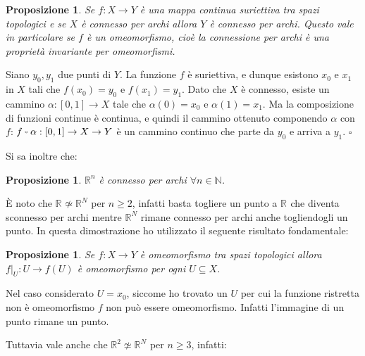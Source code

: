 \documentclass[10pt, twoside=false, x11names]{scrbook}
\newtheorem{proposition}[theorem]{Proposizione}
\newenvironment{proof}{{\textbf{Dimostrazione}:}}{\hfill $\square$}
\newcommand{\RN}[1][]{\mathbb{R}^#1}
\let\latexcirc=\circ
\newcommand{\ccirc}{\mathbin{\mathchoice
  {\xcirc\scriptstyle}
  {\xcirc\scriptstyle}
  {\xcirc\scriptscriptstyle}
  {\xcirc\scriptscriptstyle}
}}
\newcommand{\xcirc}[1]{\vcenter{\hbox{$#1\latexcirc$}}}
\let\circ\ccirc
\begin{document}
\begin{proposition}
  Se $ f:X \to Y $ è una mappa continua suriettiva tra spazi topologici e se $ X $ è connesso per archi
  allora $ Y $ è connesso per archi. Questo vale in particolare se $ f $ è un omeomorfismo, cioè la
  connessione per archi è una proprietà invariante per omeomorfismi.
\end{proposition}

\begin{proof}
  Siano $ y_0, y_1 $ due punti di $ Y $. La funzione $ f $ è suriettiva, e dunque esistono $ x_0 $ e $ x_1 $ in $ X $
  tali che $ f(x_0)=y_0 $ e $ f(x_1)=y_1 $. Dato che $ X $ è connesso, esiste un cammino $ \alpha:[0,1] \to X $ tale che $ \alpha(0)=x_0 $
  e $ \alpha(1)=x_1 $. Ma la composizione di funzioni continue è continua, e quindi il cammino ottenuto componendo $ \alpha $ con $ f $:
  $ f \circ \alpha : [0,1] \to X \to Y $ è un cammino continuo che parte da $ y_0 $ e arriva a $ y_1 $.
\end{proof}

Si sa inoltre che:
\begin{proposition}
  $ \RN{n} $ è connesso per archi $ \forall n \in \mathbb{N} $.
\end{proposition}

È noto che $ \RN{} \not \simeq \RN{N} $ per $ n \geq 2 $, infatti basta togliere un punto a $ \RN{} $ che diventa sconnesso per archi
mentre $ \RN{N} $ rimane connesso per archi anche togliendogli un punto. In questa dimostrazione ho utilizzato
il seguente risultato fondamentale:
\begin{proposition}
  Se $ f: X \to Y $ è omeomorfismo tra spazi topologici allora $ f \rvert_U : U \to f(U) $ è omeomorfismo per ogni $ U \subseteq X $.
\end{proposition}
Nel caso considerato $ U = {x_0} $, siccome ho trovato un $ U $ per cui la funzione ristretta non è omeomorfismo $ f $
non può essere omeomorfismo. Infatti l'immagine di un punto rimane un punto.

Tuttavia vale anche che $ \RN{2} \not \simeq \RN{N} $ per $ n \geq 3 $, infatti:
\end{document}
